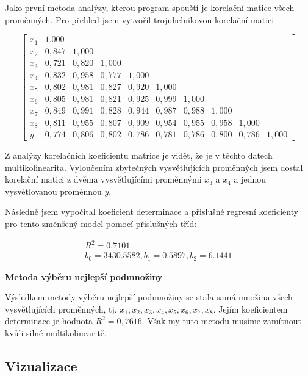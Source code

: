 \documentclass[a4paper,12pt,twoside]{scrreprt}
\begin{document}
Jako první metoda analýzy, kterou program spouští je korelační matice všech proměnných. Pro přehled jsem vytvořil trojuhelnikovou korelační matici

$$
\begin{bmatrix}
x_1 & 1.000\\
x_2 & 0,847 & 1,000\\
x_3 & 0,721 & 0,820 & 1,000\\
x_4 & 0,832 & 0,958 & 0,777 & 1,000 \\
x_5 & 0,802 & 0,981 & 0,827 & 0,920 & 1,000 \\
x_6 & 0,805 & 0,981 & 0,821 &0,925 & 0,999 & 1,000 \\
x_7 & 0,849 & 0,991 & 0,828 & 0,944 & 0,987 & 0,988 & 1,000 \\
x_8 & 0,811 & 0,955 & 0,807 & 0,909 & 0,954 & 0,955 & 0,958 & 1,000 \\
y & 0,774 & 0,806 & 0,802 & 0,786 & 0,781 & 0,786 & 0,800 & 0,786 & 1,000 
\end{bmatrix}
$$

Z analýzy korelačních koeficientu matrice je vidět, že je v těchto datech multikolinearita. Vyloučením zbytečných vysvětlujících proměnných jsem dostal korelační matici z dvěma vysvětlujícími proměnnými $x_3$ a $x_4$ a jednou vysvětlovanou proměnnou $y$.   

Následně jsem vypočital koeficient determinace a přislušné regresní koeficienty pro tento změnšený model pomocí příslušných tříd: 

\begin{displaymath}
\begin{array}{ll}
R^2 = 0.7101 \\
b_0 = 3430.5582, b_1 = 0.5897, b_2 = 6.1441
\end{array}
\end{displaymath}

\normalsize\textbf{\newline Metoda výběru nejlepší podmnožiny}

Výsledkem metody výběru nejlepší podmnožiny se stala samá množina všech vysvětlujících proměnných, tj. ${x_1, x_2, x_3, x_4, x_5, x_6, x_7, x_8}$. Jejím koeficientem determinace je hodnota $R^2 = 0,7616$. Však my tuto metodu musíme zamítnout kvůli silné multikolinearitě.  

\subsection{Vizualizace}
\end{document}
